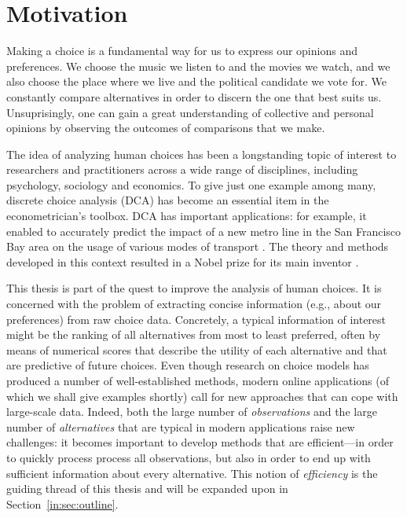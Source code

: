 \section{Motivation}
\label{in:sec:motivation}

Making a choice is a fundamental way for us to express our opinions and preferences.
We choose the music we listen to and the movies we watch, and we also choose the place where we live and the political candidate we vote for.
We constantly compare alternatives in order to discern the one that best suits us.
Unsuprisingly, one can gain a great understanding of collective and personal opinions by observing the outcomes of comparisons that we make.

The idea of analyzing human choices has been a longstanding topic of interest to researchers and practitioners across a wide range of disciplines, including psychology, sociology and economics.
To give just one example among many, discrete choice analysis (DCA) has become an essential item in the econometrician's toolbox.
DCA has important applications: for example, it enabled to accurately predict the impact of a new metro line in the San Francisco Bay area on the usage of various modes of transport \citep{mcfadden1977demand}.
The theory and methods developed in this context resulted in a Nobel prize for its main inventor \citep{mcfadden2001economic}.

This thesis is part of the quest to improve the analysis of human choices.
It is concerned with the problem of extracting concise information (e.g., about our preferences) from raw choice data.
Concretely, a typical information of interest might be the ranking of all alternatives from most to least preferred, often by means of numerical scores that describe the utility of each alternative and that are predictive of future choices.
Even though research on choice models has produced a number of well-established methods, modern online applications (of which we shall give examples shortly) call for new approaches that can cope with large-scale data.
Indeed, both the large number of \emph{observations} and the large number of \emph{alternatives} that are typical in modern applications raise new challenges:
it becomes important to develop methods that are efficient---in order to quickly process process all observations, but also in order to end up with sufficient information about every alternative.
This notion of \emph{efficiency} is the guiding thread of this thesis and will be expanded upon in Section~\ref{in:sec:outline}.

